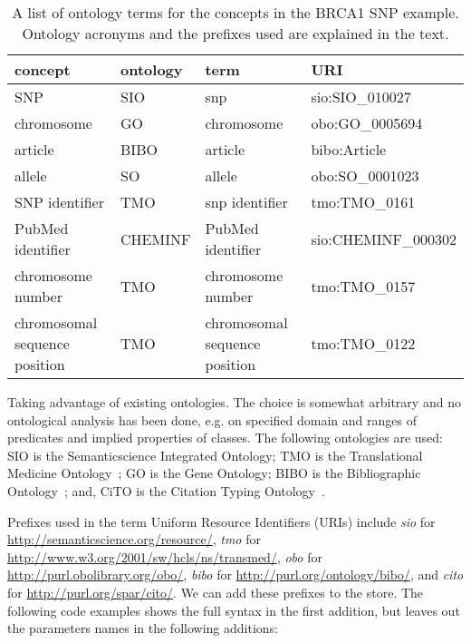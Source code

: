 \documentclass[12pt]{article}
\begin{document}
\begin{table}
\caption{A list of ontology terms for the concepts in the BRCA1 SNP example. Ontology acronyms and the prefixes
used are explained in the text.}
\begin{center}
\begin{footnotesize}
\begin{tabular}{l|l|l|l}
 \textbf{concept} & \textbf{ontology} & \textbf{term} & \textbf{URI} \\
\hline
 SNP & SIO & snp & sio:SIO\_010027 \\
 chromosome & GO & chromosome & obo:GO\_0005694 \\
 article &  BIBO & article & bibo:Article \\
 allele & SO & allele & obo:SO\_0001023 \\
 SNP identifier & TMO & snp identifier & tmo:TMO\_0161 \\
 PubMed identifier & CHEMINF & PubMed identifier & sio:CHEMINF\_000302\\
 chromosome number & TMO & chromosome number & tmo:TMO\_0157 \\
 chromosomal sequence position & TMO & chromosomal sequence position & tmo:TMO\_0122 \\
\end{tabular}
\end{footnotesize}
\end{center}
\end{table}

Taking advantage of existing ontologies. The choice is somewhat arbitrary and no ontological
analysis has been done, e.g. on specified domain and ranges of predicates and implied
properties of classes. The following ontologies are used:
SIO is the Semanticscience Integrated Ontology;
TMO is the Translational Medicine Ontology~\cite{Luciano2011};
GO is the Gene Ontology;
BIBO is the Bibliographic Ontology~\cite{d2009bibliographic}; and, 
CiTO is the Citation Typing Ontology~\cite{Shotton2010}.

Prefixes used in the term Uniform Resource Identifiers (URIs) include
\textit{sio} for \url{http://semanticscience.org/resource/},
\textit{tmo} for \url{http://www.w3.org/2001/sw/hcls/ns/transmed/},
\textit{obo} for \url{http://purl.obolibrary.org/obo/},
\textit{bibo} for \url{http://purl.org/ontology/bibo/}, and
\textit{cito} for \url{http://purl.org/spar/cito/}.
We can add these prefixes to the store. The following code examples
shows the full syntax in the first addition, but leaves out the
parameters names in the following additions:
\end{document}
